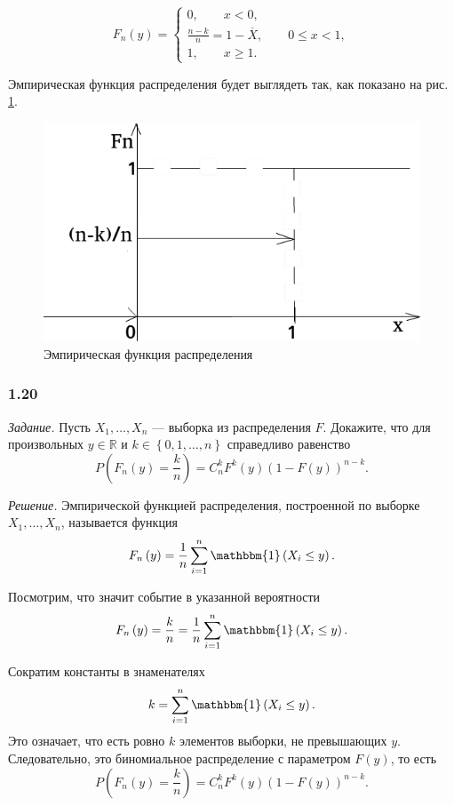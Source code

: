 $$F_n \left( y \right) =
  \begin{cases}
    0, \qquad x < 0, \\
    \frac{n - k}{n} = 1 - \overline{X}, \qquad 0 \leq x < 1, \\
    1, \qquad x \geq 1.
\end{cases}$$

Эмпирическая функция распределения будет выглядеть так, как показано на рис. \ref{fig:119}.

\begin{figure}[h!]
  \centering
  \includegraphics[width=.4\textwidth]{./pictures/1_19.png}
  \caption{Эмпирическая функция распределения}
  \label{fig:119}
\end{figure}

\subsubsection*{1.20}

\textit{Задание.} Пусть $X_1, \dotsc, X_n$ --- выборка из распределения $F$.
Докажите,
что для произвольных $y \in \mathbb{R}$ и $k \in \left\{ 0, 1, \dotsc, n \right\} $
справедливо равенство
$$P \left( F_n \left( y \right) = \frac{k}{n} \right) =
  C_n^k F^k \left( y \right) \left( 1 - F \left( y \right) \right)^{n - k}.$$

\textit{Решение.} Эмпирической функцией распределения, построенной по выборке $X_1, \dotsc, X_n$,
называется функция
$$F_n \left( y \right) =
  \frac{1}{n} \sum \limits_{i = 1}^n \mathbbm{1} \left( X_i \leq y \right).$$

Посмотрим, что значит событие в указанной вероятности
$$F_n \left( y \right) =
  \frac{k}{n} =
  \frac{1}{n} \sum \limits_{i = 1}^n \mathbbm{1} \left( X_i \leq y \right).$$

Сократим константы в знаменателях
$$k =
  \sum \limits_{i = 1}^n \mathbbm{1} \left( X_i \leq y \right).$$
Это означает, что есть ровно $k$ элементов выборки, не превышающих $y$.
Следовательно, это биномиальное распределение с параметром $F \left( y \right) $, то есть
$$P \left( F_n \left( y \right) = \frac{k}{n} \right) =
  C_n^k F^k \left( y \right) \left( 1 - F \left( y \right) \right)^{n - k}.$$

